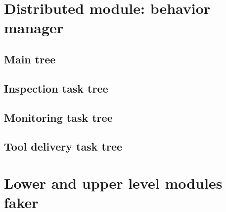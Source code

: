 \section{Distributed module: behavior manager}
\label{sec:Distributed module: behavior manager}

\subsection{Main tree}
\label{sec:MainTree}

\subsection{Inspection task tree}
\label{sec:InspectionTaskTree}

\subsection{Monitoring task tree}
\label{sec:MonitoringTaskTree}

\subsection{Tool delivery task tree}
\label{sec:ToolDeliveryTaskTree}

\section{Lower and upper level modules faker}
\label{sec:LowerAndUpperLevelModulesFaker}

